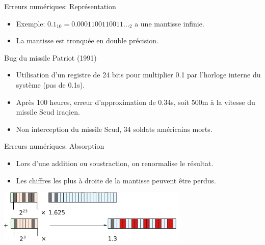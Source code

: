 \documentclass{beamer}
\begin{document}
\begin{frame}{Erreurs numériques: Représentation}
    \begin{itemize}
        \item Exemple: $0.1_{10} = 0.0001100110011\ldots_2$ a une mantisse infinie.
        \item La mantisse est tronquée en double précision.
    \end{itemize}
    \begin{block}{Bug du missile Patriot (1991)}
        \begin{itemize}
            \item Utilisation d'un registre de 24 bits pour multiplier 0.1 par l'horloge interne du système (pas de 0.1s).
            \item Après 100 heures, erreur d'approximation de 0.34s, soit 500m à la vitesse du missile Scud iraqien.
            \item Non interception du missile Scud, 34 soldats américains morts.
        \end{itemize}
    \end{block}
\end{frame}

\begin{frame}{Erreurs numériques: Absorption}
    \begin{itemize}
        \item Lors d'une addition ou soustraction, on renormalise le résultat.
        \item Les chiffres les plus à droite de la mantisse peuvent être perdus.
    \end{itemize}
    \hfill
    \center\includegraphics[height=2.5cm]{absorption.pdf}
\end{frame}
\end{document}
